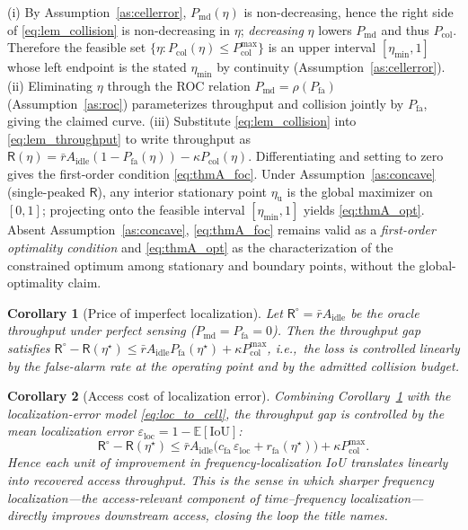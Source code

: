 \documentclass[journal]{IEEEtran}
\newtheorem{corollary}{Corollary}
\newcommand{\E}{\mathbb{E}}
\newcommand{\Pmd}{P_{\mathrm{md}}}         %
\newcommand{\Pfa}{P_{\mathrm{fa}}}         %
\newcommand{\thr}{\eta}                    %
\newcommand{\Pcol}{P_{\mathrm{col}}}       %
\newcommand{\Pcolmax}{P_{\mathrm{col}}^{\max}} %
\newcommand{\thru}{\mathsf{R}}             %
\newcommand{\iou}{\mathrm{IoU}}
\newcommand{\eloc}{\varepsilon_{\mathrm{loc}}}
\newcommand{\cfa}{c_{\mathrm{fa}}}
\newcommand{\rfa}{r_{\mathrm{fa}}}
\begin{document}
\begin{IEEEproof}
(i) By Assumption~\ref{as:cellerror}, $\Pmd(\thr)$ is non-decreasing, hence
the right side of \eqref{eq:lem_collision} is non-decreasing in $\thr$;
\emph{decreasing} $\thr$ lowers $\Pmd$ and thus $\Pcol$. Therefore the
feasible set $\{\thr:\Pcol(\thr)\le\Pcolmax\}$ is an upper interval
$[\thr_{\min},1]$ whose left endpoint is the stated $\thr_{\min}$ by
continuity (Assumption~\ref{as:cellerror}).
(ii) Eliminating $\thr$ through the ROC relation $\Pmd=\rho(\Pfa)$
(Assumption~\ref{as:roc}) parameterizes throughput and collision jointly by
$\Pfa$, giving the claimed curve.
(iii) Substitute \eqref{eq:lem_collision} into \eqref{eq:lem_throughput} to
write throughput as $\thru(\thr)=\bar r A_{\mathrm{idle}}(1-\Pfa(\thr))
-\kappa\Pcol(\thr)$. Differentiating and setting to zero gives the
first-order condition \eqref{eq:thmA_foc}. Under
Assumption~\ref{as:concave} (single-peaked $\thru$), any interior stationary
point $\thr_{\mathrm u}$ is the global maximizer on $[0,1]$; projecting onto
the feasible interval $[\thr_{\min},1]$ yields \eqref{eq:thmA_opt}. Absent
Assumption~\ref{as:concave}, \eqref{eq:thmA_foc} remains valid as a
\emph{first-order optimality condition} and \eqref{eq:thmA_opt} as the
characterization of the constrained optimum among stationary and boundary
points, without the global-optimality claim.
\end{IEEEproof}

\begin{corollary}[Price of imperfect localization]
\label{cor:price}
Let $\thru^{\circ}=\bar r A_{\mathrm{idle}}$ be the oracle throughput under
perfect sensing ($\Pmd=\Pfa=0$). Then the throughput gap satisfies
$\thru^{\circ}-\thru(\thr^{\star})\le
\bar r A_{\mathrm{idle}}\Pfa(\thr^{\star})+\kappa\Pcolmax$, i.e.,\ the loss is
controlled linearly by the false-alarm rate at the operating point and by
the admitted collision budget.
\end{corollary}

\begin{corollary}[Access cost of localization error]
\label{cor:loc}
Combining Corollary~\ref{cor:price} with the localization-error model
\eqref{eq:loc_to_cell}, the throughput gap is controlled by the mean
localization error $\eloc=1-\E[\iou]$:
\begin{equation}
\thru^{\circ}-\thru(\thr^{\star})\le
\bar r A_{\mathrm{idle}}\bigl(\cfa\,\eloc+\rfa(\thr^{\star})\bigr)
+\kappa\Pcolmax .
\label{eq:loc_gap}
\end{equation}
Hence each unit of improvement in frequency-localization IoU translates
linearly into recovered access throughput. This is the sense in which sharper
frequency localization---the access-relevant component of time--frequency
localization---directly improves downstream access, closing the loop the
title names.
\end{corollary}
\end{document}
